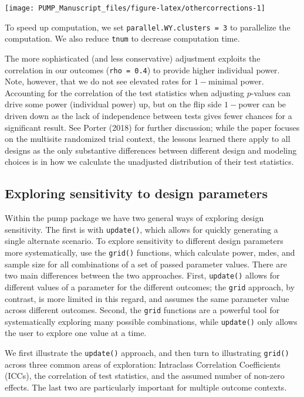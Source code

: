 \documentclass[
]{article}
\begin{document}
\begin{center}\texttt{[image: PUMP\_Manuscript\_files/figure-latex/othercorrections-1]} \end{center}

To speed up computation, we set \texttt{parallel.WY.clusters\ =\ 3} to
parallelize the computation. We also reduce \texttt{tnum} to decrease
computation time.

The more sophisticated (and less conservative) adjustment exploits the
correlation in our outcomes (\texttt{rho\ =\ 0.4}) to provide higher
individual power. Note, however, that we do not see elevated rates for
\(1-\)minimal power. Accounting for the correlation of the test
statistics when adjusting \(p\)-values can drive some power (individual
power) up, but on the flip side \(1-\)power can be driven down as the
lack of independence between tests gives fewer chances for a significant
result. See Porter (2018) for further discussion; while the paper
focuses on the multisite randomized trial context, the lessons learned
there apply to all designs as the only substantive differences between
different design and modeling choices is in how we calculate the
unadjusted distribution of their test statistics.

\subsection{Exploring sensitivity to design parameters}

Within the pump package we have two general ways of exploring design
sensitivity. The first is with \texttt{update()}, which allows for
quickly generating a single alternate scenario. To explore sensitivity
to different design parameters more systematically, use the
\texttt{grid()} functions, which calculate power, mdes, and sample size
for all combinations of a set of passed parameter values. There are two
main differences between the two approaches. First, \texttt{update()}
allows for different values of a parameter for the different outcomes;
the \texttt{grid} approach, by contrast, is more limited in this regard,
and assumes the same parameter value across different outcomes. Second,
the \texttt{grid} functions are a powerful tool for systematically
exploring many possible combinations, while \texttt{update()} only
allows the user to explore one value at a time.

We first illustrate the \texttt{update()} approach, and then turn to
illustrating \texttt{grid()} across three common areas of exploration:
Intraclass Correlation Coefficients (ICCs), the correlation of test
statistics, and the assumed number of non-zero effects. The last two are
particularly important for multiple outcome contexts.
\end{document}
